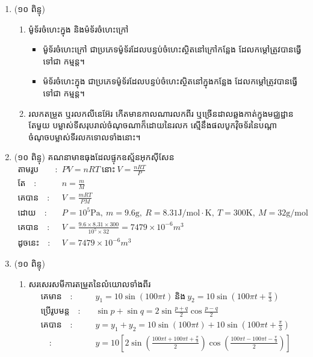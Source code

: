 \documentclass{classes/exam}
\begin{document}
\begin{enumerate}[I]
	\item {\color{magenta}\ks (១០ ពិន្ទុ)}
	\begin{enumerate}[k]
		\item ម៉ូទ័រចំហេះក្នុង និងម៉ទ័រចំហេះក្រៅ
		\begin{itemize}
			\item ម៉ូទ័រចំហេះក្រៅ ជាប្រភេទម៉ូទ័រដែលបន្ទប់ចំហេះស្ថិតនៅក្រៅកន្លែង ដែលកម្តៅត្រូវបានធ្វើទៅជា កម្មន្ត។
			\item ម៉ទ័រចំហេះក្នុង ជាប្រភេទម៉ូទ័រដែលបន្ទប់ចំហេះស្ថិតនៅក្នុងកន្លែង ដែលកម្តៅត្រូវបានធ្វើទៅជា កម្មន្ត។
		\end{itemize}
		\item រលកតម្រួត ឬរលកលីនេអ៊ែរ កើតមានកាលណារលកពីរ ឬច្រើនដាលឆ្លងកាត់ក្នុងមជ្ឈដ្ឋានតែមួយ បម្លាស់ទីសរុបរាល់ចំណុចណាក៏ដោយនៃរលក ស្មើនឹងផលបូកវ៉ិចទ័រនៃបណ្តាចំណុចបម្លាស់ទីរលកទោលទាំងនោះ។
	\end{enumerate}
	\item {\color{magenta}\ks (១០ ពិន្ទុ)} គណនាមាឌធុងដែលផ្ទុកឧស្ម័នអុកស៊ីសែន
	\begin{align*}
		\text{តាមរូបមន្ត}\quad :&\quad PV=nRT~\text{នោះ}~V=\frac{nRT}{P}\\
		\text{តែ}\quad :&\quad n=\frac{m}{M}\\
		\text{គេបាន}\quad :&\quad V=\frac{mRT}{PM}\\
		\text{ដោយ}\quad :&\quad P=10^{5}\si{\pascal},~m=9.6\si{\gram},~R=8.31\si{\joule/\mole\cdot\kelvin},~T=300\si{\kelvin},~M=32\si{\gram/\mole}\\
		\text{គេបាន}\quad :&\quad V=\frac{9.6\times 8.31\times 300}{10^{5}\times 32}=7479\times 10^{-6}m^{3}\\
		\text{ដូចនេះ}\quad :&\quad V=7479\times 10^{-6}m^{3}
	\end{align*}
	\item {\color{magenta}\ks (១០ ពិន្ទុ)}
	\begin{enumerate}[k]
		\item សរសេរសមីការតម្រួតនៃលំយោលទាំងពីរ
		\begin{align*}
			\text{គេមាន}\quad :&\quad y_{1}=10\sin\left(100\pi t\right)~\text{និង}~y_{2}=10\sin\left(100\pi t+\frac{\pi}{3}\right)\\
			\text{ប្រើរូបមន្ត}\quad :&\quad \sin p + \sin q =2\sin\frac{p+q}{2}\cos\frac{p-q}{2}\\
			\text{គេបាន}\quad:&\quad y=y_{1}+y_{2}=10\sin\left(100\pi t\right)+10\sin\left(100\pi t+\frac{\pi}{3}\right)\\
			\quad :&\quad y=10\left[2\sin\left(\frac{100\pi t+100\pi t +\frac{\pi}{3}}{2}\right)\cos\left(\frac{100\pi t-100\pi t -\frac{\pi}{3}}{2}\right)\right]\\

\end{align*}
\end{enumerate}
\end{enumerate}
\end{document}
